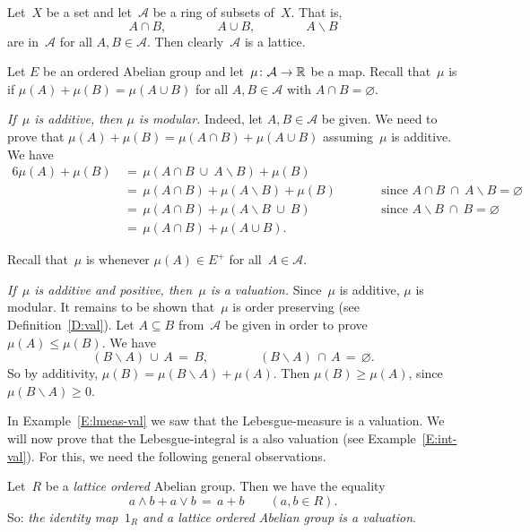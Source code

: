 \documentclass[main.tex]{subfiles}
\begin{document}
\begin{ex}
Let~$X$ be a set and let~$\mathcal{A}$ be a ring of subsets of~$X$.
That is,
\begin{equation*}
A\cap B,\qquad\qquad A\cup B,\qquad\qquad A\backslash B
\end{equation*}
are in~$\mathcal{A}$ for all $A,B\in\mathcal{A}$.
Then clearly~$\mathcal{A}$ is a lattice.

Let $E$ be an ordered Abelian group
and let~$\mu\colon \mathcal{A}\rightarrow \mathbb{R}$ be a map.
Recall that~$\mu$ is  if $\mu(A) + \mu(B) = \mu(A\cup B)$
for all $A,B\in\mathcal{A}$ with $A\cap B=\varnothing$.

\emph{If~$\mu$ is additive,
then $\mu$ is modular.}
Indeed,
let $A,B\in \mathcal{A}$ be given. We need to prove that
$\mu(A) + \mu(B) =\mu(A\cap B) + \mu(A\cup B)$
assuming~$\mu$ is additive.
We have
\begin{alignat*}{6}
\mu(A) + \mu(B) \,
  & =\, \mu(A\cap B \ \cup\ A\backslash B) + \mu(B) \\ 
  & =\, \mu(A\cap B) + \mu(A\backslash B)  + \mu(B)\qquad
    && \text{since } A\cap B \ \cap\ A\backslash B = \varnothing \\ 
  & =\, \mu(A\cap B) + \mu(A\backslash B \ \cup\ B ) 
    && \text{since } A\backslash B\ \cap\ B = \varnothing \\
  & =\, \mu(A\cap B) + \mu(A\cup B).
\end{alignat*}

Recall that~$\mu$ is  whenever
$\mu(A)\in E^+$ for all~$A\in\mathcal{A}$.

\emph{If~$\mu$ is additive and positive,
then~$\mu$ is a valuation.}
Since~$\mu$ is additive,
$\mu$ is modular.
It remains to be shown that~$\mu$ is order preserving
(see Definition~\ref{D:val}).
Let $A\subseteq B$ from~$\mathcal{A}$ be given
in order to prove $\mu(A)\leq \mu(B)$.
We have
\begin{equation*}
(B\backslash A)\,\cup\, A\,=\,B,\qquad\qquad 
(B\backslash A)\,\cap\, A\,=\,\varnothing.
\end{equation*}
So by additivity, 
$\mu(B)=\mu(B\backslash A)+\mu(A)$.
Then $\mu(B)\geq \mu(A)$, since $\mu(B\backslash A)\geq 0$.
\end{ex}

In Example~\ref{E:lmeas-val}
we saw that the Lebesgue-measure is a valuation.
We will now prove that the Lebesgue-integral is a also valuation
(see Example~\ref{E:int-val}).
For this,
we need the following general observations.
\begin{ex}
\label{E:1-valuation}
Let~$R$ be a \emph{lattice ordered} Abelian group.
Then we have the equality
\begin{equation*}
a\wedge b  + a\vee b \,=\, a+b \qquad(a,b\in R).
\end{equation*}
So: \emph{the identity map~$1_R$
and a lattice ordered Abelian group is a valuation}.
\end{ex}
\end{document}
